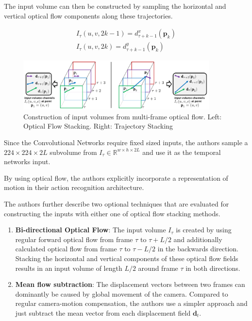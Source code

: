 The input volume can then be constructed by sampling the horizontal and vertical optical flow components along these trajectories.

\begin{align*}
    I_\tau(u,v,2k-1) = d_{\tau + k - 1}^x(\mathbf{p}_{k}) \\
    I_\tau(u,v,2k) = d_{\tau + k - 1}^y(\mathbf{p}_{k})
\end{align*}

\begin{figure}[H]
    \centering
    \includegraphics[width=0.9\textwidth]{img_deep/trajectory_stacking}
    \caption{Construction of input volumes from multi-frame optical flow. Left: Optical Flow Stacking. Right: Trajectory Stacking \cite{simonyan_two-stream_2014}}
    \label{fig:trajectory_stacking}
\end{figure}

Since the Convolutional Networks require fixed sized inputs, the authors sample a $224 \times 224 \times 2L$ subvolume from $I_\tau \in \mathbb{R}^{w \times h \times 2L}$ and use it as the temporal networks input.

By using optical flow, the authors explicitly incorporate a representation of motion in their action recognition architecture.

The authors further describe two optional techniques that are evaluated for constructing the inputs with either one of optical flow stacking methods.
\begin{enumerate}
    \item \textbf{Bi-directional Optical Flow}: The input volume $I_{\tau}$ is created by using regular forward optical flow from frame $\tau$ to $\tau + L/2$ and additionally calculated optical flow from frame $\tau$ to $\tau - L/2$ in the backwards direction. Stacking the horizontal and vertical components of these optical flow fields results in an input volume of length $L/2$ around frame $\tau$ in both directions. 
    \item \textbf{Mean flow subtraction}: The displacement vectors between two frames can dominantly be caused by global movement of the camera. Compared to regular camera-motion compensation, the authors use a simpler approach and just subtract the mean vector from each displacement field $\mathbf{d}_t$.
\end{enumerate}

